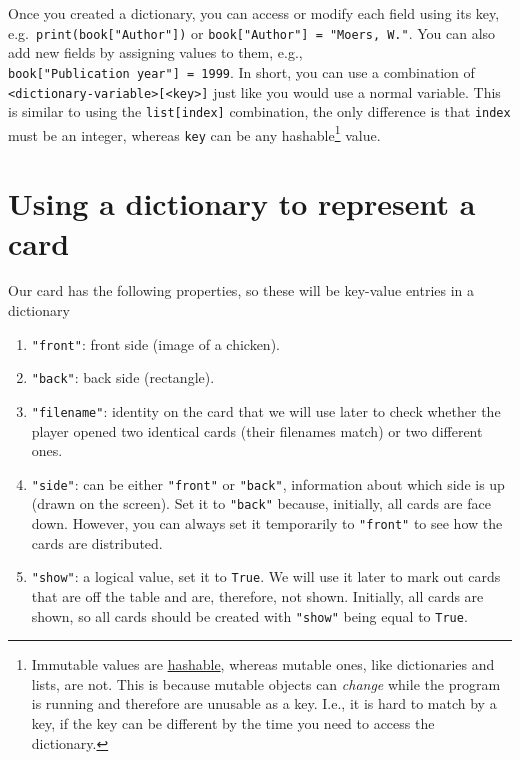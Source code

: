 \documentclass[
]{book}
\providecommand{\tightlist}{%
  \setlength{\itemsep}{0pt}\setlength{\parskip}{0pt}}
\begin{document}
Once you created a dictionary, you can access or modify each field using its key, e.g.~\texttt{print(book{[}"Author"{]})} or \texttt{book{[}"Author"{]}\ =\ "Moers,\ W."}. You can also add new fields by assigning values to them, e.g., \texttt{book{[}"Publication\ year"{]}\ =\ 1999}. In short, you can use a combination of \texttt{\textless{}dictionary-variable\textgreater{}{[}\textless{}key\textgreater{}{]}} just like you would use a normal variable. This is similar to using the \texttt{list{[}index{]}} combination, the only difference is that \texttt{index} must be an integer, whereas \texttt{key} can be any hashable\footnote{Immutable values are \href{https://docs.python.org/3/glossary.html\#term-hashable}{hashable}, whereas mutable ones, like dictionaries and lists, are not. This is because mutable objects can \emph{change} while the program is running and therefore are unusable as a key. I.e., it is hard to match by a key, if the key can be different by the time you need to access the dictionary.} value.

\hypertarget{using-a-dictionary-to-represent-a-card}{%
\section{Using a dictionary to represent a card}\label{using-a-dictionary-to-represent-a-card}}

Our card has the following properties, so these will be key-value entries in a dictionary

\begin{enumerate}
\def\labelenumi{\arabic{enumi}.}
\tightlist
\item
  \texttt{"front"}: front side (image of a chicken).
\item
  \texttt{"back"}: back side (rectangle).
\item
  \texttt{"filename"}: identity on the card that we will use later to check whether the player opened two identical cards (their filenames match) or two different ones.
\item
  \texttt{"side"}: can be either \texttt{"front"} or \texttt{"back"}, information about which side is up (drawn on the screen). Set it to \texttt{"back"} because, initially, all cards are face down. However, you can always set it temporarily to \texttt{"front"} to see how the cards are distributed.
\item
  \texttt{"show"}: a logical value, set it to \texttt{True}. We will use it later to mark out cards that are off the table and are, therefore, not shown. Initially, all cards are shown, so all cards should be created with \texttt{"show"} being equal to \texttt{True}.
\end{enumerate}
\end{document}
